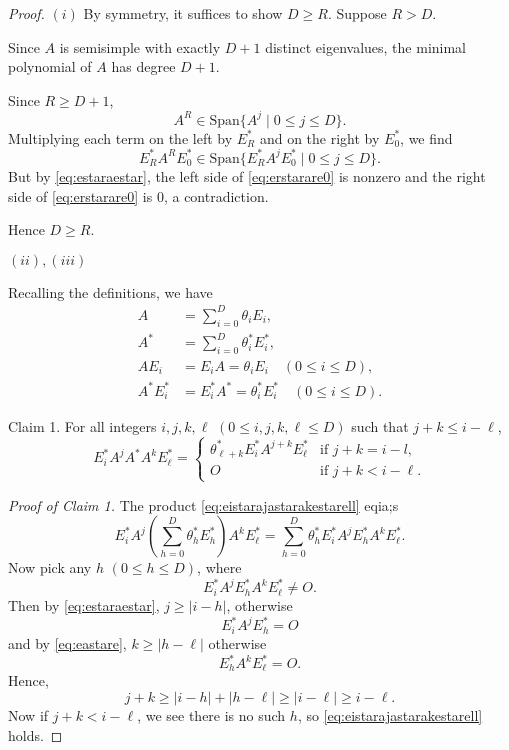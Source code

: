 \documentclass[
]{book}
\theoremstyle{definition}
\theoremstyle{definition}
\theoremstyle{definition}
\theoremstyle{definition}
\theoremstyle{remark}
\begin{document}
\begin{proof}
\leavevmode

\((i)\) By symmetry, it suffices to show \(D\geq R\). Suppose \(R > D\).

Since \(A\) is semisimple with exactly \(D+1\) distinct eigenvalues, the minimal polynomial of \(A\) has degree \(D+1\).

Since \(R \geq D+1\),
\[A^R \in \mathrm{Span}\{A^j\mid 0\leq j\leq D\}.\]
Multiplying each term on the left by \(E^*_R\) and on the right by \(E^*_0\), we find
\begin{equation}
E^*_RA^RE_0^* \in \mathrm{Span}\{E^*_RA^jE^*_0\mid 0\leq j\leq D\}. \label{eq:erstarare0}
\end{equation}
But by \eqref{eq:estaraestar}, the left side of \eqref{eq:erstarare0} is nonzero and the right side of \eqref{eq:erstarare0} is \(0\), a contradiction.

Hence \(D\geq R\).

\((ii), (iii)\)

Recalling the definitions, we have
\begin{align}
A & = \sum_{i=0}^D \theta_i E_i,\\
A^* & = \sum_{i=0}^D \theta_i^* E_i^*,\\
AE_i & = E_iA = \theta_iE_i \quad (0\leq i\leq D),\\
A^*E_i^* & = E_i^*A^* = \theta_i^*E_i^* \quad (0\leq i\leq D).
\end{align}

Claim 1. For all integers \(i,j,k,\ell\) \((0\leq i, j, k, \ell\leq D)\) such that \(j+k \leq i-\ell\),
\begin{equation}
E^*_iA^jA^*A^kE^*_\ell = \begin{cases} \theta^*_{\ell+k}E^*_iA^{j+k}E^*_\ell & \text{if } j+k = i-l,\\
O & \text{if } j+k < i-\ell.\end{cases} \label{eq:eistarajastarakestarell}
\end{equation}

\emph{Proof of Claim 1.}
The product \eqref{eq:eistarajastarakestarell} eqia;s
\[E^*_iA^j\left(\sum_{h=0}^D \theta_h^* E_h^*\right)A^kE^*_\ell = \sum_{h=0}^D \theta^*_h E^*_iA^jE^*_hA^kE^*_\ell.\]
Now pick any \(h\) \((0\leq h\leq D)\), where
\[E^*_iA^jE^*_hA^kE^*_\ell \neq O.\]
Then by \eqref{eq:estaraestar}, \(j\geq |i-h|\), otherwise
\[E^*_iA^jE^*_h = O\]
and by \eqref{eq:eastare}, \(k\geq |h-\ell|\) otherwise
\[E^*_hA^kE^*_\ell = O.\]
Hence,
\[j+k \geq |i-h|+|h-\ell| \geq |i-\ell| \geq i-\ell.\]
Now if \(j+k < i-\ell\), we see there is no such \(h\), so \eqref{eq:eistarajastarakestarell} holds.


\end{proof}
\end{document}
